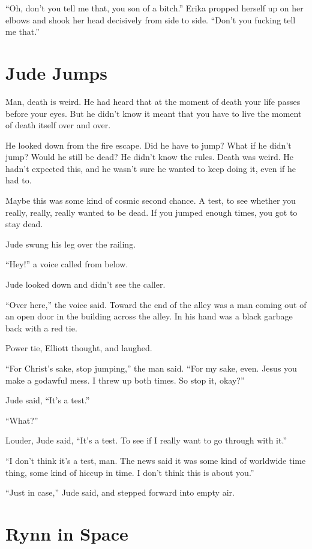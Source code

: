``Oh, don't you tell me that, you son of a bitch.'' Erika propped herself up on her elbows and shook her head decisively from side to side. ``Don't you fucking tell me that.''



\chapter{Jude Jumps}

 Man, death is weird. He had heard that at the moment of death your life passes before your eyes. But he didn't know it meant that you have to live the moment of death itself over and over.

He looked down from the fire escape. Did he have to jump? What if he didn't jump? Would he still be dead? He didn't know the rules. Death was weird. He hadn't expected this, and he wasn't sure he wanted to keep doing it, even if he had to.

Maybe this was some kind of cosmic second chance. A test, to see whether you really, really, really wanted to be dead. If you jumped enough times, you got to stay dead.

Jude swung his leg over the railing.

``Hey!'' a voice called from below.

Jude looked down and didn't see the caller.

``Over here,'' the voice said. Toward the end of the alley was a man coming out of an open door in the building across the alley. In his hand was a black garbage back with a red tie.

Power tie, Elliott thought, and laughed.

``For Christ's sake, stop jumping,'' the man said. ``For my sake, even. Jesus you make a godawful mess. I threw up both times. So stop it, okay?''

Jude said, ``It's a test.''

``What?''

Louder, Jude said, ``It's a test. To see if I really want to go through with it.''

``I don't think it's a test, man. The news said it was some kind of worldwide time thing, some kind of hiccup in time. I don't think this is about you.''

``Just in case,'' Jude said, and stepped forward into empty air.



\chapter{Rynn in Space}

